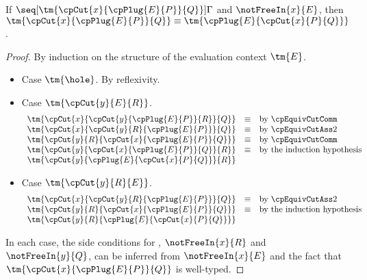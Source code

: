 \begin{lemma}\label{lem:cp-display-cut}
  If $\seq[{ \tm{\cpCut{x}{\cpPlug{E}{P}}{Q}} }]{ \Gamma }$ and
  $\notFreeIn{x}{E}$, then $\tm{\cpCut{x}{\cpPlug{E}{P}}{Q}} \equiv
  \tm{\cpPlug{E}{\cpCut{x}{P}{Q}}}$. 
\end{lemma}
\begin{proof}
  By induction on the structure of the evaluation context $\tm{E}$.
  \begin{itemize}
  \item
    Case $\tm{\hole}$. By reflexivity.
  \item
    Case $\tm{\cpCut{y}{E}{R}}$.
    \begin{gather*}
      \begin{array}{lcl}
        \tm{\cpCut{x}{\cpCut{y}{\cpPlug{E}{P}}{R}}{Q}} & \equiv &\text{by \cpEquivCutComm}\\
        \tm{\cpCut{x}{\cpCut{y}{R}{\cpPlug{E}{P}}}{Q}} & \equiv &\text{by \cpEquivCutAss2}\\
        \tm{\cpCut{y}{R}{\cpCut{x}{\cpPlug{E}{P}}{Q}}} & \equiv &\text{by \cpEquivCutComm}\\
        \tm{\cpCut{y}{\cpCut{x}{\cpPlug{E}{P}}{Q}}{R}} & \equiv &\text{by the induction hypothesis}\\ 
        \tm{\cpCut{y}{\cpPlug{E}{\cpCut{x}{P}{Q}}}{R}} &
      \end{array}
    \end{gather*}
  \item
    Case $\tm{\cpCut{y}{R}{E}}$.
    \begin{gather*}
      \begin{array}{lcl}
        \tm{\cpCut{x}{\cpCut{y}{R}{\cpPlug{E}{P}}}{Q}} & \equiv &\text{by \cpEquivCutAss2}\\
        \tm{\cpCut{y}{R}{\cpCut{x}{\cpPlug{E}{P}}{Q}}} & \equiv &\text{by the induction hypothesis}\\
        \tm{\cpCut{y}{R}{\cpPlug{E}{\cpCut{x}{P}{Q}}}}
      \end{array}
    \end{gather*}
  \end{itemize}
  In each case, the side conditions for , $\notFreeIn{x}{R}$ and
  $\notFreeIn{y}{Q}$, can be inferred from $\notFreeIn{x}{E}$ and the fact that
  $\tm{\cpCut{x}{\cpPlug{E}{P}}{Q}}$ is well-typed.
\end{proof}
